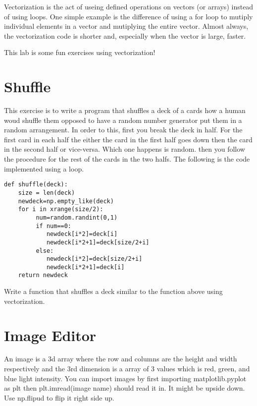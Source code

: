 \label{lab:Python_Vectorization}

Vectorization is the act of useing defined operations on vectors (or arrays) instead of using loops. One simple example is the difference of using a for loop to mutiply individual elements in a vector and mutiplying the entire vector. Almost always, the vectorization code is shorter and, especially when the vector is large, faster.

This lab is some fun exercises using vectorization!

\section*{Shuffle}

This exercise is to write a program that shuffles a deck of a cards how a human woud shuffle them opposed to have a random number generator put them in a random arrangement. In order to this, first you break the deck in half. For the first card in each half the either the card in the first half goes down then the card in the second half or vice-versa. Which one happens is random. then you follow the procedure for the rest of the cards in the two halfs. The following is the code implemented using a loop. 

\begin{lstlisting}
def shuffle(deck):
    size = len(deck)
    newdeck=np.empty_like(deck)
    for i in xrange(size/2):
         num=random.randint(0,1)
         if num==0:
            newdeck[i*2]=deck[i]
            newdeck[i*2+1]=deck[size/2+i]
         else:
            newdeck[i*2]=deck[size/2+i]
            newdeck[i*2+1]=deck[i]
    return newdeck
\end{lstlisting}

\begin{problem}
Write a function that shuffles a deck similar to the function above using vectorization.
\end{problem}

\section*{Image Editor}

An image is a 3d array where the row and columns are the height and width respectively and the 3rd dimension is a array of 3 values which is red, green, and blue light intensity. You can import images by first importing matplotlib.pyplot as plt then plt.imread(image name) should read it in. It might be upside down. Use np.flipud to flip it right side up.

